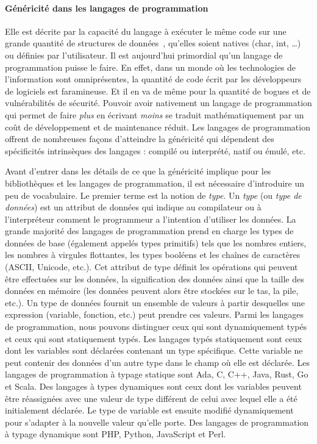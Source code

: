 \paragraph{Généricité dans les langages de programmation} Elle est décrite par la capacité du langage à exécuter le même
code sur une grande quantité de structures de données~\parencite{dehnert.1998.fundamentals}, qu'elles soient natives
(char, int, \ldots) ou définies par l'utilisateur. Il est aujourd'hui primordial qu'un langage de programmation puisse
le faire. En effet, dans un monde où les technologies de l'information sont omniprésentes, la quantité de code écrit par
les développeurs de logiciels est faramineuse. Et il en va de même pour la quantité de bogues et de vulnérabilités de
sécurité. Pouvoir avoir nativement un langage de programmation qui permet de faire \emph{plus} en écrivant \emph{moins}
se traduit mathématiquement par un coût de développement et de maintenance réduit. Les langages de programmation offrent
de nombreuses façons d'atteindre la généricité qui dépendent des spécificités intrinsèques des langages : compilé ou
interprété, natif ou émulé, etc.

Avant d'entrer dans les détails de ce que la généricité implique pour les bibliothèques et les langages de
programmation, il est nécessaire d'introduire un peu de vocabulaire. Le premier terme est la notion de \emph{type}. Un
\emph{type} (ou \emph{type de données}) est un attribut de données qui indique au compilateur ou à l'interpréteur
comment le programmeur a l'intention d'utiliser les données. La grande majorité des langages de programmation prend en
charge les types de données de base (également appelés types primitifs) tels que les nombres entiers, les nombres à
virgules flottantes, les types booléens et les chaînes de caractères (ASCII, Unicode, etc.). Cet attribut de type
définit les opérations qui peuvent être effectuées sur les données, la signification des données ainsi que la taille des
données en mémoire (les données peuvent alors être stockées sur le tas, la pile, etc.). Un type de données fournit un
ensemble de valeurs à partir desquelles une expression (\cad variable, fonction, etc.) peut prendre ces valeurs. Parmi
les langages de programmation, nous pouvons distinguer ceux qui sont dynamiquement typés et ceux qui sont statiquement
typés. Les langages typés statiquement sont ceux dont les variables sont déclarées contenant un type spécifique. Cette
variable ne peut contenir des données d'un autre type dans le champ où elle est déclarée. Les langages de programmation
à typage statique sont Ada, C, C++, Java, Rust, Go et Scala. Des langages à types dynamiques sont ceux dont les
variables peuvent être réassignées avec une valeur de type différent de celui avec lequel elle a été initialement
déclarée. Le type de variable est ensuite modifié dynamiquement pour s'adapter à la nouvelle valeur qu'elle porte. Des
langages de programmation à typage dynamique sont PHP, Python, JavaScript et Perl.

